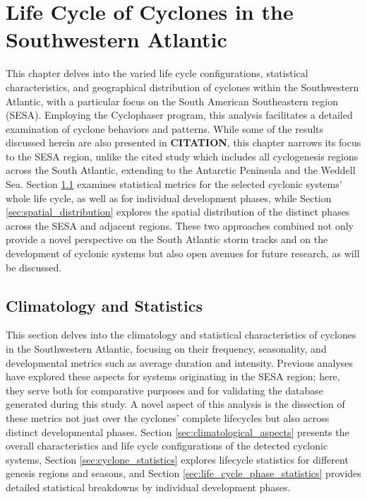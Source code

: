 \chapter{Life Cycle of Cyclones in the Southwestern Atlantic}

This chapter delves into the varied life cycle configurations, statistical characteristics, and geographical distribution of cyclones within the Southwestern Atlantic, with a particular focus on the South American Southeastern region (SESA). Employing the Cyclophaser program, this analysis facilitates a detailed examination of cyclone behaviors and patterns. While some of the results discussed herein are also presented in \textbf{CITATION}, this chapter narrows its focus to the SESA region, unlike the cited study which includes all cyclogenesis regions across the South Atlantic, extending to the Antarctic Peninsula and the Weddell Sea. Section \ref{sec:climatology_statistics} examines statistical metrics for the selected cyclonic systems' whole life cycle, as well as for individual development phases, while Section \ref{sec:spatial_distribution} explores the spatial distribution of the distinct phases across the SESA and adjacent regions. These two approaches combined not only provide a novel perspective on the South Atlantic storm tracks and on the development of cyclonic systems but also open avenues for future research, as will be discussed.

\section{Climatology and Statistics}
\label{sec:climatology_statistics}

This section delves into the climatology and statistical characteristics of cyclones in the Southwestern Atlantic, focusing on their frequency, seasonality, and developmental metrics such as average duration and intensity. Previous analyses have explored these aspects for systems originating in the SESA region; here, they serve both for comparative purposes and for validating the database generated during this study. A novel aspect of this analysis is the dissection of these metrics not just over the cyclones’ complete lifecycles but also across distinct developmental phases. Section \ref{sec:climatological_aspects} presents the overall characteristics and life cycle configurations of the detected cyclonic systems, Section \ref{sec:cyclone_statistics} explores lifecycle statistics for different genesis regions and seasons, and Section \ref{sec:life_cycle_phase_statistics} provides detailed statistical breakdowns by individual development phases.


